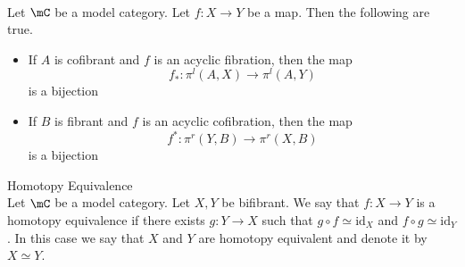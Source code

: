 \documentclass[a4paper]{article}
\begin{document}
\begin{lmm}{}{}\\ Let $\mC$ be a model category. Let $f:X\to Y$ be a map. Then the following are true. 
\begin{itemize}
\item If $A$ is cofibrant and $f$ is an acyclic fibration, then the map $$f_\ast:\pi^l(A,X)\to\pi^l(A,Y)$$ is a bijection
\item If $B$ is fibrant and $f$ is an acyclic cofibration, then the map $$f^\ast:\pi^r(Y,B)\to\pi^r(X,B)$$ is a bijection
\end{itemize}
\end{lmm}

\begin{defn}{Homotopy Equivalence}{}\\ Let $\mC$ be a model category. Let $X,Y$ be bifibrant. We say that $f:X\to Y$ is a homotopy equivalence if there exists $g:Y\to X$ such that $g\circ f\simeq\text{id}_X$ and $f\circ g\simeq\text{id}_Y$. In this case we say that $X$ and $Y$ are homotopy equivalent and denote it by $X\simeq Y$. 
\end{defn}
\end{document}
